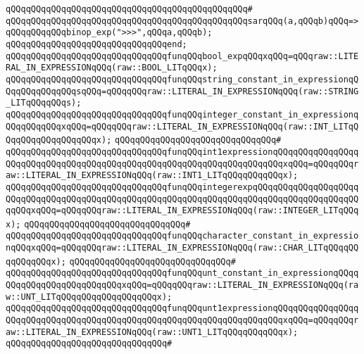\verb|qQQqqQQqqQQqqQQqqQQqqQQqqQQqqQQqqQQqqQQqqQQqqQQq#|\newline
\verb|qQQqqQQqqQQqqQQqqQQqqQQqqQQqqQQqqQQqqQQqqQQqqQQqsarqQQq(a,qQQqb)qQQq=>qQQqqQQqqQQqbinop_exp(">>>",qQQqa,qQQqb);|\newline
\verb|qQQqqQQqqQQqqQQqqQQqqQQqqQQqqQQqend;|\newline
\newline
\verb|qQQqqQQqqQQqqQQqqQQqqQQqqQQqqQQqfunqQQqbool_expqQQqxqQQq=qQQqraw::LITERAL_IN_EXPRESSIONqQQq(raw::BOOL_LITqQQqx);|\newline
\newline
\verb|qQQqqQQqqQQqqQQqqQQqqQQqqQQqqQQqfunqQQqstring_constant_in_expressionqQQqqQQqqQQqqQQqsqQQq=qQQqqQQqraw::LITERAL_IN_EXPRESSIONqQQq(raw::STRING_LITqQQqqQQqs);|\newline
\verb|qQQqqQQqqQQqqQQqqQQqqQQqqQQqqQQqfunqQQqinteger_constant_in_expressionqQQqqQQqqQQqxqQQq=qQQqqQQqraw::LITERAL_IN_EXPRESSIONqQQq(raw::INT_LITqQQqqQQqqQQqqQQqqQQqx);|\newline
\verb|qQQqqQQqqQQqqQQqqQQqqQQqqQQqqQQq#|\newline
\verb|qQQqqQQqqQQqqQQqqQQqqQQqqQQqqQQqfunqQQqint1expressionqQQqqQQqqQQqqQQqqQQqqQQqqQQqqQQqqQQqqQQqqQQqqQQqqQQqqQQqqQQqqQQqqQQqqQQqxqQQq=qQQqqQQqraw::LITERAL_IN_EXPRESSIONqQQq(raw::INT1_LITqQQqqQQqqQQqx);|\newline
\verb|qQQqqQQqqQQqqQQqqQQqqQQqqQQqqQQqfunqQQqintegerexpqQQqqQQqqQQqqQQqqQQqqQQqqQQqqQQqqQQqqQQqqQQqqQQqqQQqqQQqqQQqqQQqqQQqqQQqqQQqqQQqqQQqqQQqqQQqqQQqxqQQq=qQQqqQQqraw::LITERAL_IN_EXPRESSIONqQQq(raw::INTEGER_LITqQQqx);|\newline
\verb|qQQqqQQqqQQqqQQqqQQqqQQqqQQqqQQq#|\newline
\verb|qQQqqQQqqQQqqQQqqQQqqQQqqQQqqQQqfunqQQqcharacter_constant_in_expressionqQQqxqQQq=qQQqqQQqraw::LITERAL_IN_EXPRESSIONqQQq(raw::CHAR_LITqQQqqQQqqQQqqQQqx);|\newline
\verb|qQQqqQQqqQQqqQQqqQQqqQQqqQQqqQQq#|\newline
\verb|qQQqqQQqqQQqqQQqqQQqqQQqqQQqqQQqfunqQQqunt_constant_in_expressionqQQqqQQqqQQqqQQqqQQqqQQqqQQqxqQQq=qQQqqQQqraw::LITERAL_IN_EXPRESSIONqQQq(raw::UNT_LITqQQqqQQqqQQqqQQqqQQqx);|\newline
\verb|qQQqqQQqqQQqqQQqqQQqqQQqqQQqqQQqfunqQQqunt1expressionqQQqqQQqqQQqqQQqqQQqqQQqqQQqqQQqqQQqqQQqqQQqqQQqqQQqqQQqqQQqqQQqqQQqqQQqxqQQq=qQQqqQQqraw::LITERAL_IN_EXPRESSIONqQQq(raw::UNT1_LITqQQqqQQqqQQqx);|\newline
\verb|qQQqqQQqqQQqqQQqqQQqqQQqqQQqqQQq#|\newline

